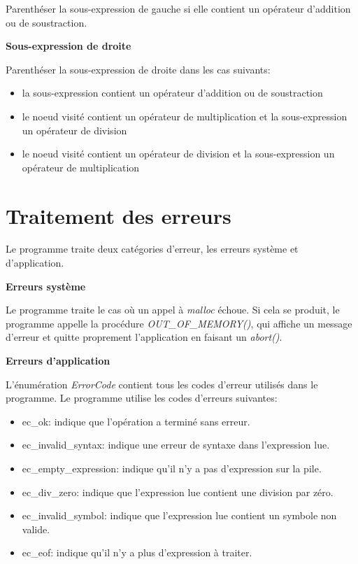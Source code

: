 \documentclass[10pt]{report}
\begin{document}
Parenthéser la sous-expression de gauche si elle contient un opérateur d'addition ou de soustraction.

\textbf{Sous-expression de droite}

Parenthéser la sous-expression de droite dans les cas suivants:

\begin{itemize}
\item la sous-expression contient un opérateur d'addition ou de soustraction
\item le noeud visité contient un opérateur de multiplication et la sous-expression un opérateur de division
\item le noeud visité contient un opérateur de division et la sous-expression un opérateur de multiplication
\end{itemize}

\section{Traitement des erreurs}
Le programme traite deux catégories d'erreur, les erreurs système et
d'application.

\textbf{Erreurs système}

Le programme traite le cas où un appel à \emph{malloc} échoue. Si cela se
produit, le programme appelle la procédure \emph{OUT\_OF\_MEMORY()}, qui affiche un message
d'erreur et quitte proprement l'application en faisant un \emph{abort()}.

\textbf{Erreurs d'application}

L'énumération \emph{ErrorCode} contient tous les codes d'erreur utilisés dans
le programme. Le programme utilise les codes d'erreurs suivantes:

\begin{itemize}
\item ec\_ok: indique que l'opération a terminé sans erreur.
\item ec\_invalid\_syntax: indique une erreur de syntaxe dans l'expression
lue.
\item ec\_empty\_expression: indique qu'il n'y a pas d'expression sur la pile.
\item ec\_div\_zero: indique que l'expression lue contient une division par
zéro.
\item ec\_invalid\_symbol: indique que l'expression lue contient un symbole
non valide.
\item ec\_eof: indique qu'il n'y a plus d'expression à traiter.
\end{itemize}
\end{document}
